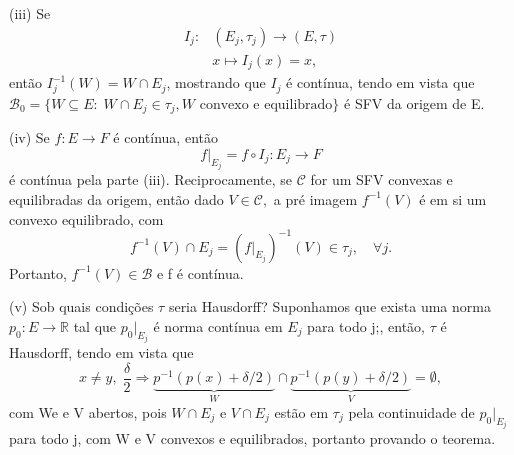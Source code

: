\documentclass[../distribution_theory_notes.tex]{subfiles}
\begin{document}
\begin{proof*}
            (iii) Se 
           \begin{align*}
             I_{j}:&(E_{j}, \tau_{j})\rightarrow (E, \tau )\\ 
                   &x\mapsto I_{j}(x)=x,
           \end{align*}
           então \(I_{j}^{-1}(W)=W\cap E_{j}\), mostrando que \(I_{j}\) é contínua, tendo em vista que \(\mathcal{B}_{0}=\{W\subseteq E:\; W\cap E_{j}\in \tau_{j}, W \text{ convexo e equilibrado}\}\) é SFV da origem de E.

           (iv) Se \(f:E\rightarrow F\) é contínua, então 
             \[
               f|_{E_{j}}=f\circ I_{j}:E_{j}\rightarrow F
             \]
             é contínua pela parte (iii). Reciprocamente, se \(\mathcal{C}\) for um SFV convexas e equilibradas da origem, então dado \(V\in \mathcal{C},\) a pré imagem \(f^{-1}(V)\) é em si um convexo equilibrado, com 
               \[
                 f^{-1}(V)\cap E_{j} = (f|_{E_{j}})^{-1}(V)\in \tau_{j},\quad \forall j.
               \]
               Portanto, \(f^{-1}(V)\in \mathcal{B}\) e f é contínua. \qedsymbol

               (v) Sob quais condições \(\tau \) seria Hausdorff? Suponhamos que exista uma norma \(p_{0}:E\rightarrow \mathbb{R}\) tal que \(p_{0}|_{E_{j}}\) é norma contínua em \(E_{j}\) para todo j;, então, \(\tau \) é Hausdorff, tendo em vista que 
                 \[
                   x\neq y,\; \frac{\delta }{2} \Rightarrow \underbrace{p^{-1}(p(x)+\delta/2)}_{W}\cap \underbrace{p^{-1}(p(y)+\delta/2)}_{V} = \emptyset,
                 \]
                 com We e V abertos, pois \(W\cap E_{j}\) e \(V\cap E_{j}\) estão em \(\tau_{j}\) pela continuidade de \(p_{0}|_{E_{j}}\) para todo j, com W e V convexos e equilibrados, portanto provando o teorema. \qedsymbol
\end{proof*}
  
\end{document}
